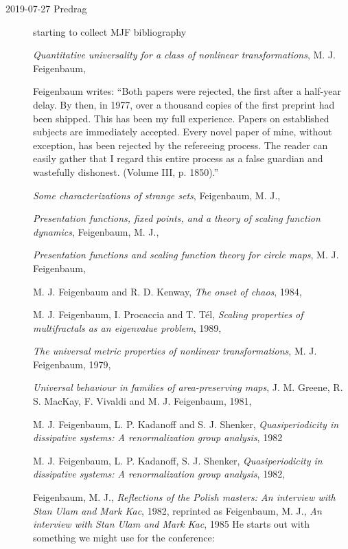 \begin{description}
\item[2019-07-27 Predrag]
starting to collect MJF bibliography

{\em Quantitative universality for a class of nonlinear transformations},
{M. J. Feigenbaum},

Feigenbaum writes:
``Both papers were rejected, the first after a half-year delay. By then,
in 1977, over a thousand  copies  of  the  first  preprint  had  been
shipped.  This  has  been  my  full  experience. Papers on established
subjects are immediately accepted. Every novel paper of mine, without
exception, has been rejected by the refereeing process. The reader  can
easily  gather  that  I  regard  this  entire  process  as  a  false
guardian  and  wastefully dishonest. (Volume III, p.
1850).''

{\em Some characterizations of strange sets},
{Feigenbaum, M. J.},

{\em Presentation functions, fixed points, and a theory of scaling function dynamics},
{Feigenbaum, M. J.},

{\em Presentation functions and scaling function theory for circle maps},
{M. J. Feigenbaum},

{M. J. Feigenbaum and R. D. Kenway},
{\em The onset of chaos},
{1984},

{M. J. Feigenbaum, I. Procaccia and T. T{\'e}l},
  {\em Scaling properties of multifractals as an eigenvalue problem},
{1989},

{\em The universal metric properties of nonlinear transformations},
{M. J. Feigenbaum},
{1979},

{\em Universal behaviour in families of area-preserving maps},
{J. M. Greene, R. S. MacKay, F. Vivaldi and M. J. Feigenbaum},
{1981},

{M. J. Feigenbaum, L. P. Kadanoff and S. J. Shenker},
  {\em Quasiperiodicity in dissipative systems: {A} renormalization group analysis},
{1982}

{M. J. Feigenbaum, L. P. Kadanoff, S. J. Shenker},
  {\em Quasiperiodicity in dissipative systems: {A} renormalization group analysis},
{1982},

{Feigenbaum, M. J.},
{\em Reflections of the {Polish} masters: {An} interview with {Stan Ulam} and {Mark Kac}},
{1982},
reprinted as
{Feigenbaum, M. J.},
  {\em An interview with {Stan Ulam} and {Mark Kac}},
  {1985}
He starts out with something we might use for the conference:


\end{description}
